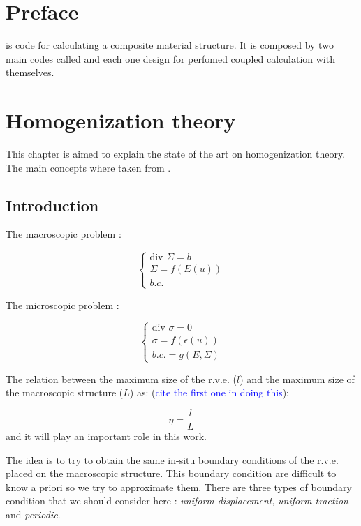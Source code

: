 \chapter{Preface}

\par
\sputnik is code for calculating a composite material structure. It is composed by two main codes called \macro and
\micro each one design for perfomed coupled calculation with themselves.

\chapter{Homogenization theory}
This chapter is aimed to explain the state of the art on homogenization theory. The main concepts where taken from
\cite{suquet_1985}.

\section{Introduction}

\begin{figure}[h!]
\resizebox{5cm}{!}{
 
}
\end{figure}

The macroscopic problem :

\[
\begin{cases}
   \text{div } \Sigma =  b\\
   \Sigma = f(E(u))\\
   b.c.
\end{cases}
\]

The microscopic problem :

\[
\begin{cases}
   \text{div } \sigma = 0\\
   \sigma = f(\epsilon(u))\\
   b.c. = g(E , \Sigma) 
\end{cases}
\]

The relation between the maximum size of the r.v.e. ($l$) and the maximum size of the macroscopic 
structure ($L$) as: (\textcolor{blue}{cite the first one in doing this}):

\[
  \eta = \frac{l}{L}
\]
and it will play an important role in this work.

The idea is to try to obtain the same in-situ boundary conditions of the r.v.e. placed on 
the macroscopic structure. This boundary condition are difficult to know a priori so we try to 
approximate them. There are three types of boundary condition that we should consider here : 
\emph{uniform displacement}, \emph{uniform traction} and \emph{periodic}.

